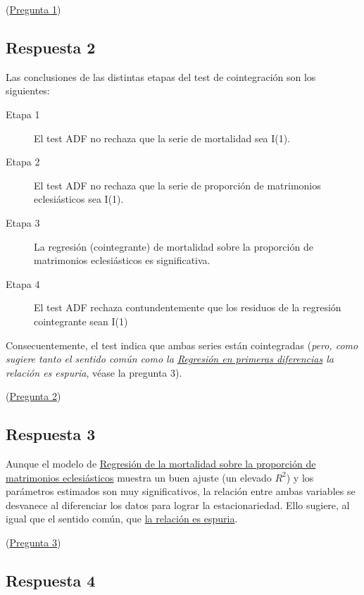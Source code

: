 \documentclass[10pt]{article}
\begin{document}
(\hyperref[sec:org6255f49]{Pregunta 1})
\subsection*{Respuesta 2}
\label{sec:orgb5b4964}

Las conclusiones de las distintas etapas del test de cointegración son los siguientes:
\begin{description}
\item[{Etapa 1}] El test ADF no rechaza que la serie de mortalidad sea I(1).
\item[{Etapa 2}] El test ADF no rechaza que la serie de proporción de
matrimonios eclesiásticos sea I(1).
\item[{Etapa 3}] La regresión (cointegrante) de mortalidad sobre la
proporción de matrimonios eclesiásticos es significativa.
\item[{Etapa 4}] El test ADF rechaza contundentemente que los residuos de
la regresión cointegrante sean I(1)
\end{description}

Consecuentemente, el test indica que ambas series están cointegradas
(\emph{pero, como sugiere tanto el sentido común como la \hyperref[sec:orgc1eb125]{Regresión en primeras diferencias} la relación es espuria}, véase la pregunta 3).

(\hyperref[sec:orgd5bc258]{Pregunta 2})
\subsection*{Respuesta 3}
\label{sec:orgb023825}

Aunque el modelo de \hyperref[sec:org459e064]{Regresión de la mortalidad sobre la proporción de matrimonios eclesiásticos} muestra un buen ajuste (un elevado \(R^2\)) y
los parámetros estimados son muy significativos, la relación entre
ambas variables se desvanece al diferenciar los datos para lograr la
estacionariedad. Ello sugiere, al igual que el sentido común, que \uline{la
relación es espuria}.

(\hyperref[sec:org13fc090]{Pregunta 3})
\subsection*{Respuesta 4}
\label{sec:org9fe344e}
\end{document}
